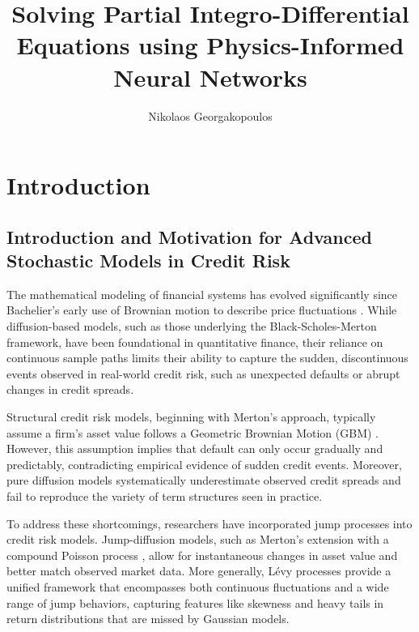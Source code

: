 \documentclass[11pt,twoside,openright]{report}
\title{Solving Partial Integro-Differential Equations using Physics-Informed Neural Networks}
\author{Nikolaos Georgakopoulos}
\date{\the\year{}}
\begin{document}
\doublespacing



\maketitle








\chapter{Introduction}
\label{chap:intro_levy_credit}

\section{Introduction and Motivation for Advanced Stochastic Models in Credit Risk}
\label{sec:intro_chapter1}

The mathematical modeling of financial systems has evolved significantly since Bachelier's early use of Brownian motion to describe price fluctuations \cite{bachelier1900theorie}. While diffusion-based models, such as those underlying the Black-Scholes-Merton framework, have been foundational in quantitative finance, their reliance on continuous sample paths limits their ability to capture the sudden, discontinuous events observed in real-world credit risk, such as unexpected defaults or abrupt changes in credit spreads.

Structural credit risk models, beginning with Merton's approach, typically assume a firm's asset value follows a Geometric Brownian Motion (GBM) \cite{merton1974pricing}. However, this assumption implies that default can only occur gradually and predictably, contradicting empirical evidence of sudden credit events. Moreover, pure diffusion models systematically underestimate observed credit spreads and fail to reproduce the variety of term structures seen in practice.

To address these shortcomings, researchers have incorporated jump processes into credit risk models. Jump-diffusion models, such as Merton's extension with a compound Poisson process \cite{merton1976option}, allow for instantaneous changes in asset value and better match observed market data. More generally, Lévy processes provide a unified framework that encompasses both continuous fluctuations and a wide range of jump behaviors, capturing features like skewness and heavy tails in return distributions that are missed by Gaussian models.
\end{document}
